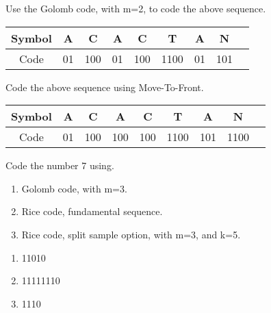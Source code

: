 \begin{question}
Use the Golomb code, with m=2, to code the above sequence.
\end{question}
\begin{solution}
\begin{tabular}{|c|c|c|c|c|c|c|c|c|}
\hline 
Symbol & A & C & A & C & T & A & N \\ 
\hline 
Code & 01 & 100 & 01 & 100 & 1100 & 01 & 101 \\ 
\hline 
\end{tabular} 
\end{solution}

\begin{question}
Code the above sequence using Move-To-Front.
\end{question}
\begin{solution}
\begin{tabular}{|c|c|c|c|c|c|c|c|c|}
\hline 
Symbol & A & C & A & C & T & A & N \\ 
\hline 
Code & 01 & 100 & 100 & 100 & 1100 & 101 & 1100 \\ 
\hline 
\end{tabular} 
\end{solution}

\begin{question}
Code the number 7 using.
\begin{enumerate}
\item Golomb code, with m=3.
\item Rice code, fundamental sequence.
\item Rice code, split sample option, with m=3, and k=5.
\end{enumerate}
\end{question}
\begin{solution}
\begin{enumerate}
\item 11010
\item 11111110
\item 1110
\end{enumerate}
\end{solution}

